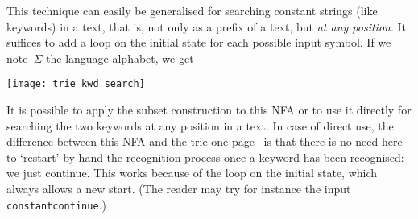 This technique can easily be generalised for searching constant
strings (like keywords) in a text, that is, not only as a prefix of a
text, but \emph{at any position}. It suffices to add a loop on the
initial state for each possible input symbol. If we note~\(\Sigma\)
the language alphabet, we get
\begin{center}
\texttt{[image: trie\_kwd\_search]}
\end{center}
It is possible to apply the subset construction to this NFA or to use
it directly for searching the two keywords at any position in a
text. In case of direct use, the difference between this NFA and the
trie one page~\pageref{trie_kwd} is that there is no need here to
`restart' by hand the recognition process once a keyword has been
recognised: we just continue. This works because of the loop on the
initial state, which always allows a new start. (The reader may try
for instance the input \texttt{constantcontinue}.)

